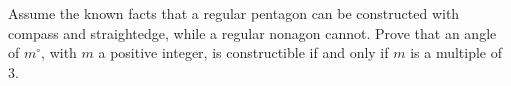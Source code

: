 Assume the known facts that a regular pentagon can be constructed with compass and straightedge, while a regular nonagon cannot. Prove that an angle of $m^\circ$, with $m$ a positive integer, is constructible if and only if $m$ is a multiple of $3$.
